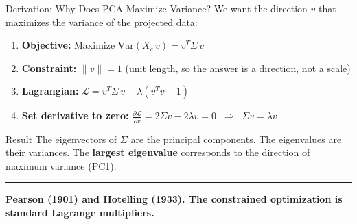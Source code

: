 \documentclass[8pt,aspectratio=169]{beamer}
\newcommand{\bottomnote}[1]{%
\vfill
\vspace{-2mm}
\textcolor{mllavender2}{\rule{\textwidth}{0.4pt}}
\vspace{1mm}
\footnotesize
\textbf{#1}
}
\newcommand{\highlight}[1]{\textcolor{mlorange}{\textbf{#1}}}
\begin{document}
\begin{frame}[t]{Derivation: Why Does PCA Maximize Variance?}
\small
We want the direction $v$ that maximizes the variance of the projected data:

\vspace{2mm}
\begin{enumerate}
\setlength{\itemsep}{4pt}
\item \textbf{Objective:} Maximize $\text{Var}(X_c \, v) = v^T \Sigma \, v$
\item \textbf{Constraint:} $\|v\| = 1$ \;\;(unit length, so the answer is a direction, not a scale)
\item \textbf{Lagrangian:} $\mathcal{L} = v^T \Sigma \, v - \lambda(v^T v - 1)$
\item \textbf{Set derivative to zero:} $\frac{\partial \mathcal{L}}{\partial v} = 2\Sigma v - 2\lambda v = 0 \;\;\Rightarrow\;\; \Sigma v = \lambda v$
\end{enumerate}

\vspace{3mm}
\begin{block}{Result}
\small The eigenvectors of $\Sigma$ are the principal components. The eigenvalues are their variances. The \highlight{largest eigenvalue} corresponds to the direction of maximum variance (PC1).
\end{block}

\bottomnote{Pearson (1901) and Hotelling (1933). The constrained optimization is standard Lagrange multipliers.}
\end{frame}
\end{document}

